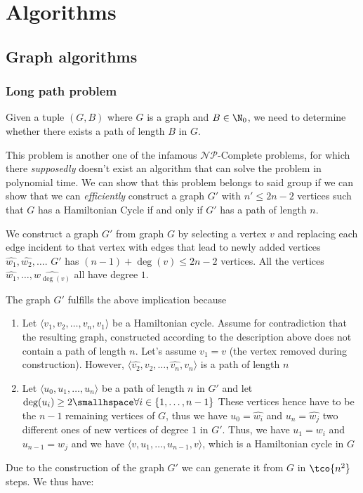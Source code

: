 \newsection
\section{Algorithms}
\subsection{Graph algorithms}

\subsubsection{Long path problem}
Given a tuple $(G, B)$ where $G$ is a graph and $B \in \N_0$, we need to determine whether there exists a path of length $B$ in $G$.

This problem is another one of the infamous $\mathcal{N}\mathcal{P}$-Complete problems, for which there \textit{supposedly} doesn't exist an algorithm that can solve the problem in polynomial time.
We can show that this problem belongs to said group if we can show that we can \textit{efficiently} construct a graph $G'$ with $n' \leq 2n - 2$ vertices such that $G$ has a Hamiltonian Cycle if and only if $G'$ has a path of length $n$.

We construct a graph $G'$ from graph $G$ by selecting a vertex $v$ and replacing each edge incident to that vertex with edges that lead to newly added vertices $\hat{w_1}, \hat{w_2}, \ldots$.
$G'$ has $(n - 1) + \deg(v) \leq 2n - 2$ vertices. All the vertices $\hat{w_1}, \ldots, \hat{w_{\deg(v)}}$ all have degree $1$.

The graph $G'$ fulfills the above implication because
\begin{enumerate}[label=(\roman*)]
    \item Let $\langle v_1, v_2, \ldots, v_n, v_1 \rangle$ be a Hamiltonian cycle.
          Assume for contradiction that the resulting graph, constructed according to the description above does not contain a path of length $n$.
          Let's assume $v_1 = v$ (the vertex removed during construction). However, $\langle \hat{v_2}, v_2, \ldots, \hat{v_n}, v_n \rangle$ is a path of length $n$
    \item Let $\langle u_0, u_1, \ldots, u_n \rangle$ be a path of length $n$ in $G'$ and let $\deg(u_i) \geq 2 \smallhspace \forall i \in \{1, \ldots, n - 1\}$ These vertices hence have to be the $n - 1$ remaining vertices of $G$, thus we have $u_0 = \hat{w_i}$ and $u_n = \hat{w_j}$ two different ones of new vertices of degree $1$ in $G'$. Thus, we have $u_1 = w_i$ and $u_{n - 1} = w_j$ and we have $\langle v, u_1, \ldots, u_{n - 1}, v \rangle$, which is a Hamiltonian cycle in $G$
\end{enumerate}
Due to the construction of the graph $G'$ we can generate it from $G$ in $\tco{n^2}$ steps. We thus have:

